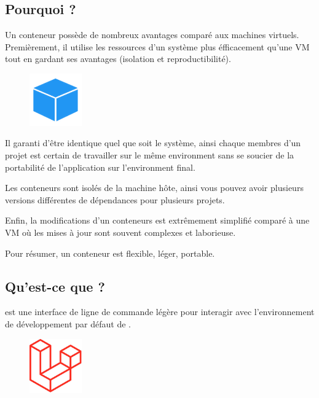 \documentclass[internal]{nhitec_design}
\begin{document}
    \subsection[Pourquoi Docker?]{Pourquoi \docker{}?}

        Un conteneur \docker{} possède de nombreux avantages comparé aux machines virtuels. Premièrement, il utilise les ressources d'un système plus éfficacement qu'une VM tout en gardant ses avantages (isolation et reproductibilité). 

        \begin{figure}
            \centering
            \includegraphics[width=0.2\textwidth]{Images_formation/Iconconteneur.pdf}
        \end{figure}

        Il garanti d'être identique quel que soit le système, ainsi chaque membres d'un projet est certain de travailler sur le même environment sans se soucier de la portabilité de l'application sur l'environment final.
        
        Les conteneurs sont isolés de la machine hôte, ainsi vous pouvez avoir plusieurs versions différentes de dépendances pour plusieurs projets.

        Enfin, la modifications d'un conteneurs est extrêmement simplifié comparé à une VM où les mises à jour sont souvent complexes et laborieuse.

        Pour résumer, un conteneur \docker{} est flexible, léger, portable.

        
\newpage

    \subsection[Qu'est-ce que Laravel Sail?]{Qu'est-ce que \laravelsail{}?}
        
        \laravelsail{} est une interface de ligne de commande légère pour interagir avec l'environnement de développement \docker{} par défaut de \laravel{}. 
        
        \begin{figure}
            \centering
            \includegraphics[width=0.2\textwidth]{Images_formation/LaravelLogo.pdf}
        \end{figure}
        
\end{document}
